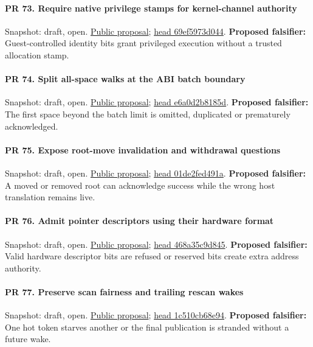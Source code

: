 \paragraph{PR 73. Require native privilege stamps for kernel-channel authority}
\readcode Snapshot: draft, open.
\href{\repobase/pull/73}{Public proposal};
\href{\repobase/commit/69ef5973d0440dca5333b13a667557b4c7b1c57b}{head 69ef5973d044}.
\textbf{Proposed falsifier:} Guest-controlled identity bits grant privileged execution without a
  trusted allocation stamp.

\paragraph{PR 74. Split all-space walks at the ABI batch boundary}
\readcode Snapshot: draft, open.
\href{\repobase/pull/74}{Public proposal};
\href{\repobase/commit/e6a0d2b8185dd14e137dd2a06e74d387ee636912}{head e6a0d2b8185d}.
\textbf{Proposed falsifier:} The first space beyond the batch limit is omitted, duplicated or
  prematurely acknowledged.

\paragraph{PR 75. Expose root-move invalidation and withdrawal questions}
\readcode Snapshot: draft, open.
\href{\repobase/pull/75}{Public proposal};
\href{\repobase/commit/01de2fed491aca938da2b862344dafbc56c27d85}{head 01de2fed491a}.
\textbf{Proposed falsifier:} A moved or removed root can acknowledge success while the wrong host
  translation remains live.

\paragraph{PR 76. Admit pointer descriptors using their hardware format}
\readcode Snapshot: draft, open.
\href{\repobase/pull/76}{Public proposal};
\href{\repobase/commit/468a35c9d845afc1938683540acc251bdef90e5a}{head 468a35c9d845}.
\textbf{Proposed falsifier:} Valid hardware descriptor bits are refused or reserved bits create
  extra address authority.

\paragraph{PR 77. Preserve scan fairness and trailing rescan wakes}
\readcode Snapshot: draft, open.
\href{\repobase/pull/77}{Public proposal};
\href{\repobase/commit/1c510cb68e94ee85a717c50c93258bcb6012b1e7}{head 1c510cb68e94}.
\textbf{Proposed falsifier:} One hot token starves another or the final publication is stranded
  without a future wake.

